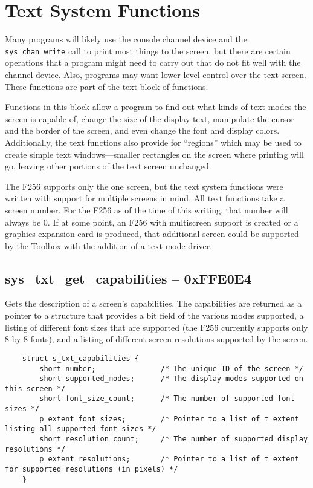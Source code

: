 \section{Text System Functions}
Many programs will likely use the console channel device and the \verb+sys_chan_write+ call to print most things to the screen,
but there are certain operations that a program might need to carry out that do not fit well with the channel device. Also,
programs may want lower level control over the text screen. These functions are part of the text block of functions.

Functions in this block allow a program to find out what kinds of text modes the screen is capable of, change the
size of the display text, manipulate the cursor and the border of the screen, and even change the font and display colors.
Additionally, the text functions also provide for ``regions'' which may be used to create simple text windows---smaller rectangles
on the screen where printing will go, leaving other portions of the text screen unchanged.

The F256 supports only the one screen, but the text system functions were written with support for multiple screens in mind.
All text functions take a screen number. For the F256 as of the time of this writing, that number will always be 0.
If at some point, an F256 with multiscreen support is created or a graphics expansion card is produced, that additional
screen could be supported by the Toolbox with the addition of a text mode driver.

\subsection*{sys\_txt\_get\_capabilities  -- 0xFFE0E4}
Gets the description of a screen's capabilities.
The capabilities are returned as a pointer to a structure that provides a bit field of the various modes supported,
a listing of different font sizes that are supported (the F256 currently supports only 8 by 8 fonts),
and a listing of different screen resolutions supported by the screen.

\begin{lstlisting}
	struct s_txt_capabilities {
		short number;               /* The unique ID of the screen */
		short supported_modes;      /* The display modes supported on this screen */
		short font_size_count;      /* The number of supported font sizes */
		p_extent font_sizes;        /* Pointer to a list of t_extent listing all supported font sizes */
		short resolution_count;     /* The number of supported display resolutions */
		p_extent resolutions;       /* Pointer to a list of t_extent for supported resolutions (in pixels) */
	}
\end{lstlisting}


